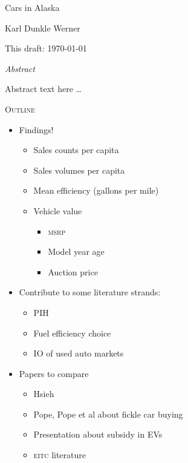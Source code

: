 \documentclass[11pt,letterpaper,oneside]{article}
\newcommand{\msrp}{\textsc{msrp}}
\newcommand{\eitc}{\textsc{eitc}}
\begin{document}
\thispagestyle{empty}
\setcounter{page}{0}
\vspace*{0.7in plus 0.3in minus 0.3in}

\begin{center}
    \textsf{\LARGE Cars in Alaska}

    \textsf{\Large Karl Dunkle Werner}

    \textsf{This draft: \today}
\end{center}

\vspace{2in plus 1in minus 0.7in}

\begin{center}
    \begin{minipage}{0.7\linewidth}
        \begin{center}
            \textit{Abstract}
        \end{center}
        Abstract text here \ldots
    \end{minipage}
\end{center}

\pagebreak

\textsc{\Large Outline}

\begin{itemize}
    \item Findings!
    \begin{itemize}
        \item Sales counts per capita
        \item Sales volumes per capita
        \item Mean efficiency (gallons per mile)
        \item Vehicle value
        \begin{itemize}
            \item \msrp{}
            \item Model year age
            \item Auction price
        \end{itemize}
    \end{itemize}
    \item Contribute to some literature strands:
    \begin{itemize}
        \item PIH
        \item Fuel efficiency choice
        \item IO of used auto markets
    \end{itemize}
    \item Papers to compare
    \begin{itemize}
        \item Hsieh
        \item Pope, Pope et al about fickle car buying
        \item Presentation about subsidy in EVs
        \item \eitc{} literature
    \end{itemize}
\end{itemize}
\end{document}
